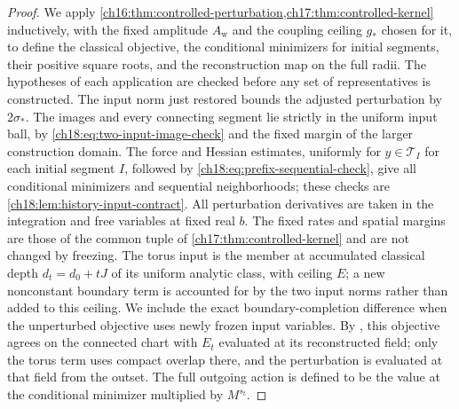 \begin{proof}
We apply \cref{ch16:thm:controlled-perturbation,ch17:thm:controlled-kernel} inductively, with the fixed amplitude $A_{\mathrm w}$ and the coupling ceiling $g_*$ chosen for it, to define the classical objective, the conditional minimizers for initial segments, their positive square roots, and the reconstruction map on the full radii. The hypotheses of each application are checked before any set of representatives is constructed. The input norm just restored bounds the adjusted perturbation by $2\sigma_*$. The images and every connecting segment lie strictly in the uniform input ball, by \eqref{ch18:eq:two-input-image-check} and the fixed margin of the larger construction domain. The force and Hessian estimates, uniformly for $y\in\mathcal T_I$ for each initial segment $I$, followed by \eqref{ch18:eq:prefix-sequential-check}, give all conditional minimizers and sequential neighborhoods; these checks are \cref{ch18:lem:history-input-contract}. All perturbation derivatives are taken in the integration and free variables at fixed real $b$. The fixed rates and spatial margins are those of the common tuple of \cref{ch17:thm:controlled-kernel} and are not changed by freezing. The torus input is the member at accumulated classical depth $d_t=d_0+tJ$ of its uniform analytic class, with ceiling $E$; a new nonconstant boundary term is accounted for by the two input norms rather than added to this ceiling. We include the exact boundary-completion difference when the unperturbed objective uses newly frozen input variables. By , this objective agrees on the connected chart with $E_t$ evaluated at its reconstructed field; only the torus term uses compact overlap there, and the perturbation is evaluated at that field from the outset. The full outgoing action is defined to be the value at the conditional minimizer multiplied by $M^{s_t}$.


\end{proof}
